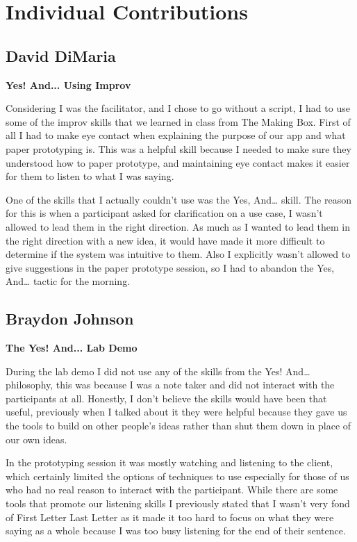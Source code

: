 \documentclass[12pt,letterpaper]{article}
\begin{document}
\clearpage
\section{Individual Contributions}
\subsection{David DiMaria}
\textbf{Yes! And... Using Improv}\par
Considering I was the facilitator, and I chose to go without a script, I had to use some of the improv skills that we learned in class from The Making Box. First of all I had to make eye contact when explaining the purpose of our app and what paper prototyping is. This was a helpful skill because I needed to make sure they understood how to paper prototype, and maintaining eye contact makes it easier for them to listen to what I was saying.\par
One of the skills that I actually couldn’t use was the Yes, And… skill. The reason for this is when a participant asked for clarification on a use case, I wasn’t allowed to lead them in the right direction. As much as I wanted to lead them in the right direction with a new idea, it would have made it more difficult to determine if the system was intuitive to them. Also I explicitly wasn’t allowed to give suggestions in the paper prototype session, so I had to abandon the Yes, And… tactic for the morning. 


\clearpage
\subsection{Braydon Johnson}
\textbf{The Yes! And... Lab Demo}\par
During the lab demo I did not use any of the skills from the Yes! And… philosophy, this was because I was a note taker and did not interact with the participants at all. Honestly, I don’t believe the skills would have been that useful, previously when I talked about it they were helpful because they gave us the tools to build on other people’s ideas rather than shut them down in place of our own ideas.\par
In the prototyping session it was mostly watching and listening to the client, which certainly limited the options of techniques to use especially for those of us who had no real reason to interact with the participant. While there are some tools that promote our listening skills I previously stated that I wasn’t very fond of First Letter Last Letter as it made it too hard to focus on what they were saying as a whole because I was too busy listening for the end of their sentence. 
\end{document}
